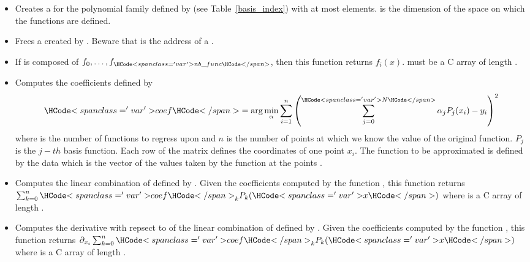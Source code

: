 \begin{itemize}
  \item {}
  \sshortdescribe Creates a  for the polynomial family
  defined by  (see Table~\ref{basis_index}) with at most 
  elements.  is the dimension of the space on which the functions are
  defined.

\item  {}
    \sshortdescribe Frees a  created by
    . Beware that  is the address of a
    \ptr.

\item  {}
  \sshortdescribe If  is composed of $f_0, \dots, f_{\var{nb\_func}}$,
  then this function returns $f_i(x)$.  must be a C array of length
  .

\item {}
  \sshortdescribe Computes the coefficients  defined by
  \begin{equation*}
    \var{coef} = \arg\min_\alpha \sum_{i=1}^n
    \left( \sum_{j=0}^{\var{N}} \alpha_j  P_j(x_i) - y_i\right)^2
  \end{equation*}
  where  is the number of functions to regress upon and $n$ is the
  number of points at which we know the value of the original function. $P_j$
  is the $j-th$ basis function. Each row of the matrix  defines the
  coordinates of one point $x_i$. The function to be approximated is defined
  by the data  which is the vector of the values taken by the function
  at the points .


\item {}
  \sshortdescribe Computes the linear combination of  defined by
  . Given the coefficients computed by the function
  , this function returns $\sum_{k=0}^n
  \var{coef}_k  P_k(\var{x})$ where  is a C array of length
  .

\item {}
  \sshortdescribe Computes the derivative with repsect to  of the
  linear combination of  defined by . Given the
  coefficients computed by the function , this
  function returns $\partial_{x_i} \sum_{k=0}^n \var{coef}_k  P_k(\var{x})$
  where  is a C array of length .


\end{itemize}
